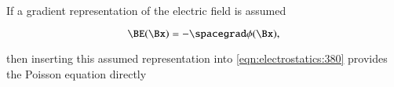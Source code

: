 %
%

If a gradient representation of the electric field is assumed

\begin{dmath}\label{eqn:electrostatics:561}
\BE(\Bx) = -\spacegrad \phi(\Bx),
\end{dmath}

then
inserting
this assumed representation into \cref{eqn:electrostatics:380} provides the
Poisson equation directly



